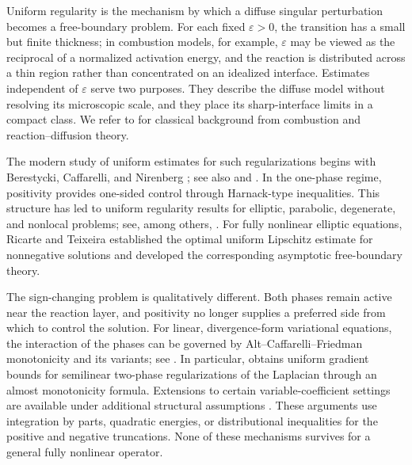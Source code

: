 \documentclass[11pt,letterpaper]{amsart}
\numberwithin{equation}{section}
\newcommand{\eps}{\varepsilon}
\theoremstyle{definition}
\theoremstyle{remark}
\begin{document}
Uniform regularity is the mechanism by which a diffuse singular perturbation
becomes a free-boundary problem. For each fixed $\eps>0$, the transition has a
small but finite thickness; in combustion models, for example, $\eps$ may be
viewed as the reciprocal of a normalized activation energy, and the reaction
is distributed across a thin region rather than concentrated on an idealized
interface. Estimates independent of $\eps$ serve two purposes. They describe
the diffuse model without resolving its microscopic scale, and they place its
sharp-interface limits in a compact class. We refer to
\cite{WilliamsCombustion,BuckmasterLudford,
BerestyckiLarrouturouLions,CaffarelliVazquez} for classical background from
combustion and reaction--diffusion theory.

The modern study of uniform estimates for such regularizations begins with
Berestycki, Caffarelli, and Nirenberg \cite{BCN}; see also
\cite{CaffarelliUniform,Weiss} and
\cite[Section~1.2]{CaffarelliSalsa}. In the one-phase regime, positivity
provides one-sided control through Harnack-type inequalities.
This structure has led to uniform regularity results for elliptic, parabolic,
degenerate, and nonlocal problems; see, among others,
\cite{CaffarelliVazquez,CaffarelliKenig,BerestyckiHamel,
CaffarelliLeeMellet,FernandezBonderWolanski,
DanielliPetrosyanShahgholian,LedermanWolanskiNonlocal,
TeixeiraVariational,AraujoRicarteTeixeira,
RicarteTeymurazyanUrbano,daSilvaViloria}. For fully nonlinear elliptic
equations, Ricarte and Teixeira \cite{RicarteTeixeira} established the optimal
uniform Lipschitz estimate for nonnegative solutions and developed the
corresponding asymptotic free-boundary theory.

The sign-changing problem is qualitatively different. Both phases remain
active near the reaction layer, and positivity no longer supplies a preferred
side from which to control the solution. For linear, divergence-form variational
equations, the interaction of the phases can be governed by
Alt--Caffarelli--Friedman monotonicity and its variants; see
\cite{AltCaffarelliFriedman,LedermanWolanskiTwoPhase,
LedermanWolanskiForcing,CaffarelliJerisonKenig,CaffarelliLedermanWolanskiI,CaffarelliLedermanWolanskiII}. In particular,
\cite[Section~5]{CaffarelliJerisonKenig} obtains uniform gradient bounds for
semilinear two-phase regularizations of the Laplacian through an almost
monotonicity formula. Extensions to certain variable-coefficient settings are
available under additional structural assumptions
\cite{TeixeiraZhangElliptic,TeixeiraZhangParabolic,
MatevosyanPetrosyan}. These arguments use integration by parts, quadratic
energies, or distributional inequalities for the positive and negative
truncations. None of these mechanisms survives for a general fully nonlinear
operator.
\end{document}
